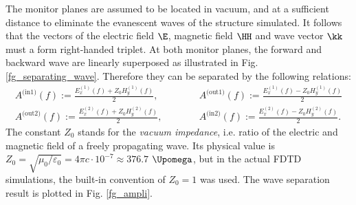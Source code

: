 The monitor planes are assumed to be located in vacuum, and at a sufficient distance to eliminate the evanescent waves of the structure simulated. It follows that the vectors of the electric field $\E$, magnetic field $\HH$ and wave vector $\kk$ must a form right-handed triplet. %
At both monitor planes, the forward and backward wave are linearly superposed as illustrated in Fig. \ref{fg_separating_wave}. Therefore they can be separated by the following relations: 
\begin{equation} 
	\begin{split}
		A^{\text{(in1)}}(f)  := \frac{E_{x}^{(1)}(f) + Z_0 H_{y}^{(1)}(f)}{2}, \quad \quad \quad & A^{\text{(out1)}}(f) := \frac{E_{x}^{(1)}(f) - Z_0 H_{y}^{(1)}(f)}{2}\\
		A^{\text{(out2)}}(f) := \frac{E_{x}^{(2)}(f) + Z_0 H_{y}^{(2)}(f)}{2}, \quad \quad \quad & A^{\text{(in2)}}(f)  := \frac{E_{x}^{(2)}(f) - Z_0 H_{y}^{(2)}(f)}{2}. 
	\end{split} 
\label{eq_separate_ampli}\end{equation}
The constant $Z_0$ stands for the \textit{vacuum impedance}, i.e. ratio of the electric and magnetic field of a freely propagating wave. Its physical value is $Z_0 = \sqrt{\mu_0/\varepsilon_0} = 4\pi c \cdot 10^{-7} \approx 376.7$ $\Upomega$, but in the actual FDTD simulations, the built-in convention of $Z_0 = 1$ was used.
The wave separation result is plotted in Fig. \ref{fg_ampli}.  
